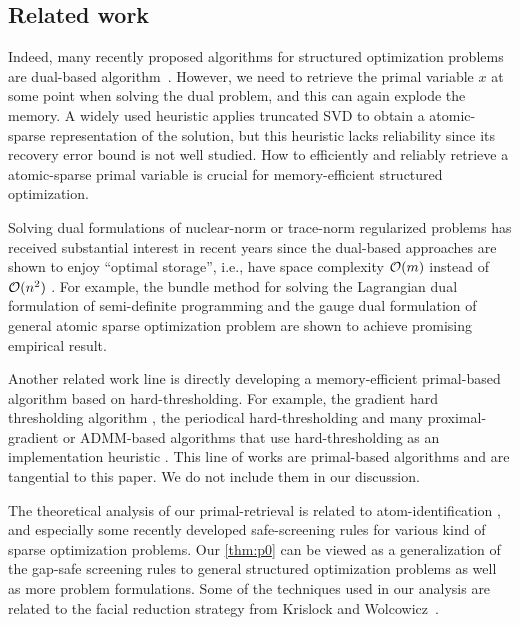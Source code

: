 \subsection{Related work}

Indeed, many recently proposed algorithms for structured optimization problems are dual-based algorithm~\cite{fan2019bundle,DingYCTU21}.  However, we need to retrieve the primal variable $x$ at some point when solving the dual problem, and this can again explode the memory. A widely used heuristic applies truncated SVD \cite[Algorithm~6.4]{fan2019alignment} to obtain a atomic-sparse representation of the solution, but this heuristic lacks reliability since its recovery error bound is not well studied. How to efficiently and reliably retrieve a atomic-sparse primal variable is crucial for memory-efficient structured optimization.

Solving dual formulations of nuclear-norm or trace-norm regularized problems has received substantial interest in recent years since the dual-based approaches are shown to enjoy ``optimal storage'', i.e., have space complexity $\mathcal{O}(m)$ instead of $\mathcal{O}( n^2 )$ \cite{DingYCTU21}. For example, the bundle method for solving the Lagrangian dual formulation of semi-definite programming \cite{helmberg2000spectral} and the gauge dual formulation of general atomic sparse optimization problem \cite{fan2019bundle} are shown to achieve promising empirical result.

Another related work line is directly developing a memory-efficient primal-based algorithm based on hard-thresholding. For example, the gradient hard thresholding algorithm \cite{YuanLZ17}, the periodical hard-thresholding \cite{Allen-ZhuHHL17} and many proximal-gradient or ADMM-based algorithms that use hard-thresholding as an implementation heuristic \cite{mazumder2010spectral,Lin11,hsieh2014nuclear}. This line of works are primal-based algorithms and are tangential to this paper. We do not include them in our discussion. 

The theoretical analysis of our primal-retrieval is related to atom-identification \cite{BurM88,hare2004identifying,hare2011identifying}, and especially some recently developed safe-screening rules \cite{Ghaoui12,wang2013lasso,liu2014safe,WangZLWY14,Raj2015ScreeningRF,BonnefoyERG15,XiangWR17,NdiayeFGS17,ZhangHLYCHW17,kuang2017screening,Atamtrk2020SafeSR,Bao20} for various kind of sparse optimization problems. Our \autoref{thm:p0} can be viewed as a generalization of the gap-safe screening rules to general structured optimization problems as well as more problem formulations. Some of the techniques used in our analysis are related to the facial reduction strategy from Krislock and Wolcowicz~\cite{krislock2010explicit}. 


